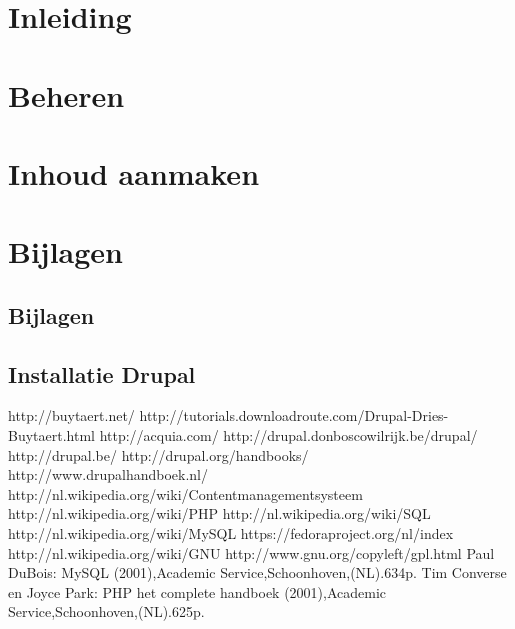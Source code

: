 \documentclass[11pt,twoside,onecolumn,titlepage,openbib]{book}
\begin{document}
\mainmatter
\part{Inleiding}
 

\part{Beheren}
 
 
 
 
 

\part{Inhoud aanmaken}
 

\part{Bijlagen}

\chapter{Bijlagen}
 
\chapter{Installatie Drupal}
% 

\begin{thebibliography}{99}
http://buytaert.net/
http://tutorials.downloadroute.com/Drupal-Dries-Buytaert.html 
http://acquia.com/  http://drupal.donboscowilrijk.be/drupal/
 http://drupal.be/
 http://drupal.org/handbooks/
 http://www.drupalhandboek.nl/
 http://nl.wikipedia.org/wiki/Contentmanagementsysteem
 http://nl.wikipedia.org/wiki/PHP
 http://nl.wikipedia.org/wiki/SQL
 http://nl.wikipedia.org/wiki/MySQL
 https://fedoraproject.org/nl/index
 http://nl.wikipedia.org/wiki/GNU
 http://www.gnu.org/copyleft/gpl.html
 Paul DuBois: MySQL (2001),Academic Service,Schoonhoven,(NL).634p. 
 Tim Converse en Joyce Park: PHP het complete handboek (2001),Academic Service,Schoonhoven,(NL).625p.
\end{thebibliography}
\printindex
\end{document}
